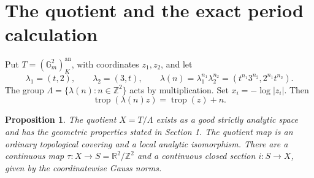 \documentclass[11pt]{article}
\newtheorem{proposition}[theorem]{Proposition}
\theoremstyle{definition}\newtheorem{definition}[theorem]{Definition}
\newcommand{\trop}{\operatorname{trop}}
\newcommand{\an}{\mathrm{an}}
\newcommand{\R}{\mathbb R}
\newcommand{\Z}{\mathbb Z}
\begin{document}
\section{The quotient and the exact period calculation}
Put $T=(\mathbb G_m^2)^{\an}_K$, with coordinates $z_1,z_2$, and let
\[
 \lambda_1=(t,2),\qquad \lambda_2=(3,t),\qquad
 \lambda(n)=\lambda_1^{n_1}\lambda_2^{n_2}
       =(t^{n_1}3^{n_2},2^{n_1}t^{n_2}).
\]
The group $\Lambda=\{\lambda(n):n\in\Z^2\}$ acts by multiplication.
Set $x_i=-\log|z_i|$. Then
\[
 \trop(\lambda(n)z)=\trop(z)+n.                         \tag{2.1}
\]

\begin{proposition}\label{quotient}
The quotient $X=T/\Lambda$ exists as a good strictly analytic space and has
the geometric properties stated in Section 1. The quotient map is an ordinary
topological covering and a local analytic isomorphism. There are a continuous
map $\tau:X\to S=\R^2/\Z^2$ and a continuous closed section $i:S\to X$,
given by the coordinatewise Gauss norms.
\end{proposition}
\end{document}
